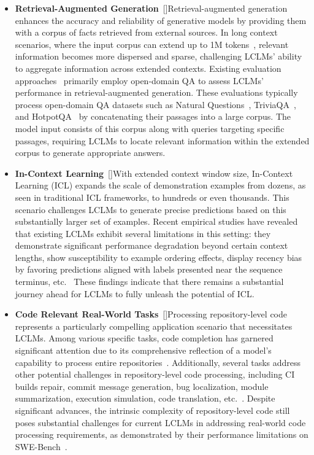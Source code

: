 \documentclass[11pt, a4paper, logo, copyright, nonumbering]{map}
\begin{document}
\begin{itemize}
    \item \textbf{Retrieval-Augmented Generation}~[]\quad Retrieval-augmented generation enhances the accuracy and reliability of generative models by providing them with a corpus of facts retrieved from external sources. In long context scenarios, where the input corpus can extend up to 1M tokens~\citep{lee2024can}, relevant information becomes more dispersed and sparse, challenging LCLMs' ability to aggregate information across extended contexts. Existing evaluation approaches~\citep{lee2024can,yen2024helmet} primarily employ open-domain QA to assess LCLMs' performance in retrieval-augmented generation. These evaluations typically process open-domain QA datasets such as Natural Questions~\citep{kwiatkowski2019natural}, TriviaQA~\citep{joshi2017triviaqa}, and HotpotQA~\citep{yang2018hotpotqa} by concatenating their passages into a large corpus. The model input consists of this corpus along with queries targeting specific passages, requiring LCLMs to locate relevant information within the extended corpus to generate appropriate answers.
    \item \textbf{In-Context Learning}~[]\quad With extended context window size, In-Context Learning (ICL) expands the scale of demonstration examples from dozens, as seen in traditional ICL frameworks, to hundreds or even thousands. This scenario challenges LCLMs to generate precise predictions based on this substantially larger set of examples\citep{li2024long,xu2024stress,lee2024can,bertsch2024context}. Recent empirical studies have revealed that existing LCLMs exhibit several limitations in this setting: they demonstrate significant performance degradation beyond certain context lengths, show susceptibility to example ordering effects, display recency bias by favoring predictions aligned with labels presented near the sequence terminus, etc.~\citep{li2024long,xu2024stress} These findings indicate that there remains a substantial journey ahead for LCLMs to fully unleash the potential of ICL.
    \item \textbf{Code Relevant Real-World Tasks}~[]\quad Processing repository-level code represents a particularly compelling application scenario that necessitates LCLMs. Among various specific tasks, code completion has garnered significant attention due to its comprehensive reflection of a model's capability to process entire repositories~\citep{bogomolov2024long,liu2024repobench,zhang2023repocoder,jimenez2024swebench}. Additionally, several tasks address other potential challenges in repository-level code processing, including CI builds repair, commit message generation, bug localization, module summarization, execution simulation, code translation, etc.~\citep{bogomolov2024long,zhang2024bench,wang2024repotransbench}. Despite significant advances, the intrinsic complexity of repository-level code still poses substantial challenges for current LCLMs in addressing real-world code processing requirements, as demonstrated by their performance limitations on SWE-Bench~\citep{jimenez2024swebench}.
\end{itemize}
\end{document}

